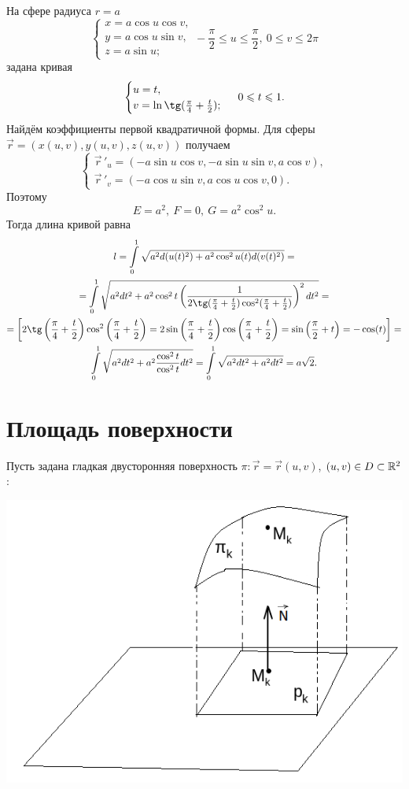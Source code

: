 \documentclass[../../main.tex]{subfiles}
\begin{document}
\begin{exmp}
На сфере радиуса $r = a$
\[\begin{cases}
 x = a\cos u\cos v,\\
 y = a\cos u\sin v,\\
 z = a\sin u;
 \end{cases}
 -\frac{\pi}{2} \leq u \leq \frac{\pi}{2},\ 
 0\leq v \leq 2\pi\]
задана кривая
\[\begin{cases}
u = t,\\
v = \ln\tg(\frac{\pi}{4} + \frac{t}{2});
\end{cases} \ 0 \leq t \leq 1.\]
Найдём коэффициенты первой квадратичной формы. Для 
сферы $\vec{r} = (x(u, v), y(u, v), z(u, v))$ получаем
\[
\begin{cases}
\vec r\,'_u = (-a\sin u\cos v, -a\sin u\sin v, a\cos v),\\
\vec r\,'_v = (-a\cos u\sin v, a\cos u\cos v, 0).
\end{cases}
\]
Поэтому
\[
E = a^2, \ F = 0, \ G = a^2\cos^2u.
\]
Тогда длина кривой равна
\begin{gather*}
l = \int\limits_0^1\sqrt{a^2d(u(t)^2) + 
a^2\cos^2u(t)d(v(t)^2)} =
\\ =
\int\limits_0^1\sqrt{a^2dt^2 + a^2\cos^2t\left(\frac{1}{2\tg(\frac{\pi}{4} + 
\frac{t}{2})\cos^2(\frac{\pi}{4} + \frac{t}{2})}\right)^2dt^2} = \\
= \left[ 2\tg\left(\frac{\pi}{4} + 
\frac{t}{2}\right)\cos^2\left(\frac{\pi}{4} + \frac{t}{2}\right) = 
2\sin\left(\frac{\pi}{4} + 
\frac{t}{2}\right)\cos\left(\frac{\pi}{4} + \frac{t}{2}\right) = \sin\left(\frac\pi2 + t\right) = -\cos(t)
\right] =\\
\int\limits_0^1\sqrt{a^2dt^2 + a^2\frac{\cos^2t}{\cos^2t}dt^2} = 
\int\limits_0^1\sqrt{a^2dt^2 + a^2dt^2} = a\sqrt2.
\end{gather*}
\end{exmp}
\section{Площадь поверхности}
Пусть задана гладкая двусторонняя поверхность $\pi : \vec{r} = \vec{r}(u, v)$, 
 $(u, v) \in D \subset \mathbb{R}^2$:

\begin{center}
\includegraphics[scale = 1]{lec22_1.png}
\end{center}
\end{document}
